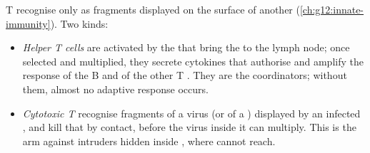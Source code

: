 \begin{proposition}[T lymphocytes]\label{prop:g12:adaptive-immunity:tcells}
T  recognise  only as fragments displayed on the
surface of another  (\cref{ch:g12:innate-immunity}). Two kinds:
\begin{itemize}
  \item \emph{Helper T cells} are activated by
        the  that bring the  to the lymph node;
        once selected and multiplied, they secrete cytokines that
        authorise and amplify the response of the B  and of the
        other T . They are the coordinators; without them, almost
        no adaptive response occurs.
  \item \emph{Cytotoxic T } recognise fragments of a virus (or
        of a  ) displayed by an infected , and kill
        that  by contact, before the virus inside it can multiply.
        This is the arm against intruders hidden inside , where
         cannot reach.
\end{itemize}
\end{proposition}
\admitted

